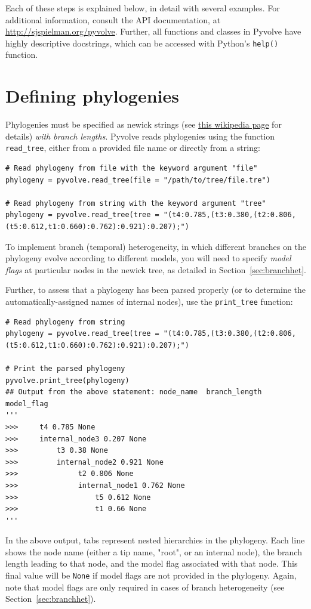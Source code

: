 \documentclass{article}
\newcommand{\code}[1]{\texttt{\small{#1}}}
\begin{document}
Each of these steps is explained below, in detail with several examples. For additional information, consult the API documentation, at \href{http://sjspielman.org/pyvolve}{http://sjspielman.org/pyvolve}. Further, all functions and classes in Pyvolve have highly descriptive docstrings, which can be accessed with Python's \code{help()} function. 


\section{Defining phylogenies}\label{sec:phylogeny}

Phylogenies must be specified as newick strings (see \href{https://en.wikipedia.org/wiki/Newick_format}{this wikipedia page} for details) \emph{with branch lengths}. Pyvolve reads phylogenies using the function \code{read\_tree}, either from a provided file name or directly from a string:
\begin{lstlisting}
# Read phylogeny from file with the keyword argument "file"
phylogeny = pyvolve.read_tree(file = "/path/to/tree/file.tre")

# Read phylogeny from string with the keyword argument "tree"
phylogeny = pyvolve.read_tree(tree = "(t4:0.785,(t3:0.380,(t2:0.806,(t5:0.612,t1:0.660):0.762):0.921):0.207);")
\end{lstlisting}

To implement branch (temporal) heterogeneity, in which different branches on the phylogeny evolve according to different models, you will need to specify \emph{model flags} at particular nodes in the newick tree, as detailed in Section~\ref{sec:branchhet}.

Further, to assess that a phylogeny has been parsed properly (or to determine the automatically-assigned names of internal nodes), use the \code{print\_tree} function:
\begin{lstlisting}
# Read phylogeny from string
phylogeny = pyvolve.read_tree(tree = "(t4:0.785,(t3:0.380,(t2:0.806,(t5:0.612,t1:0.660):0.762):0.921):0.207);")

# Print the parsed phylogeny
pyvolve.print_tree(phylogeny)
## Output from the above statement: node_name  branch_length  model_flag
'''
>>>     t4 0.785 None
>>>     internal_node3 0.207 None
>>>         t3 0.38 None
>>>         internal_node2 0.921 None
>>>              t2 0.806 None
>>>              internal_node1 0.762 None
>>>                  t5 0.612 None
>>>                  t1 0.66 None 
'''
\end{lstlisting}
In the above output, tabs represent nested hierarchies in the phylogeny. Each line shows the node name (either a tip name, "root", or an internal node), the branch length leading to that node, and the model flag associated with that node. This final value will be \code{None} if model flags are not provided in the phylogeny. Again, note that model flags are only required in cases of branch heterogeneity (see Section~\ref{sec:branchhet}). 
\end{document}
